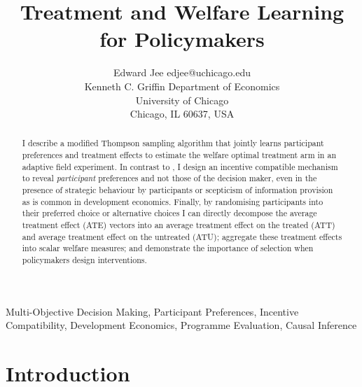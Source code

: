 \documentclass[twoside,11pt]{article}
\begin{document}
\title{
  Treatment and Welfare Learning for Policymakers
}

\author{\name Edward Jee \email edjee@uchicago.edu \\
       \addr Kenneth C. Griffin Department of Economics\\
       University of Chicago\\
       Chicago, IL 60637, USA}


\maketitle

\begin{abstract}%
I describe a modified Thompson sampling algorithm that jointly learns participant preferences and treatment 
effects to estimate the welfare optimal treatment arm in an adaptive field 
experiment. In contrast to \cite{lin2022preference}, I design an incentive 
compatible mechanism to reveal \emph{participant} preferences and not those of 
the decision maker, even in the presence of strategic behaviour by participants 
or scepticism of information 
provision as is common in development economics. Finally, by randomising 
participants into their preferred choice or alternative choices I can directly 
decompose the average treatment effect (ATE) vectors into an average treatment 
effect on the treated (ATT) and average treatment effect on the untreated (ATU); 
aggregate these treatment effects into scalar welfare measures; and demonstrate 
the importance of selection when policymakers design interventions.
\end{abstract}

\begin{keywords}
 Multi-Objective Decision Making, Participant Preferences, Incentive Compatibility, 
 Development Economics, Programme Evaluation, Causal Inference 
\end{keywords}

\section{Introduction}
\end{document}
